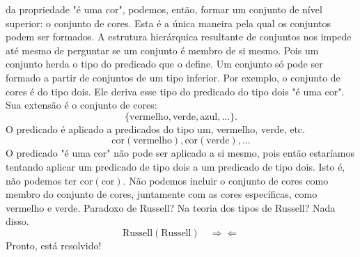       da propriedade "é uma cor", podemos, então, formar um conjunto de nível 
      superior: o conjunto de cores.\newline
      Esta é a única maneira pela qual os conjuntos podem ser formados. A estrutura 
      hierárquica resultante de conjuntos nos impede até mesmo de perguntar se um 
      conjunto é membro de si mesmo. Pois um conjunto herda o tipo do predicado que 
      o define. Um conjunto só pode ser formado a partir de conjuntos de um tipo 
      inferior. Por exemplo, o conjunto de cores é do tipo dois. Ele deriva esse tipo 
      do predicado do tipo dois "é uma cor". Sua extensão é o conjunto de cores: 
      $$\{\textrm{vermelho}, \textrm{verde}, \textrm{azul}, ...\}.$$ O predicado é 
      aplicado a predicados do tipo um, vermelho, verde, etc.
      $$\textrm{cor}(\textrm{vermelho}), \textrm{cor}(\textrm{verde}), ...$$
      O predicado "é uma cor" não pode ser aplicado a si mesmo, pois então 
      estaríamos tentando aplicar um predicado de tipo dois a um predicado de tipo 
      dois. Isto é, não podemos ter $\textrm{cor}(\textrm{cor})$. Não podemos incluir 
      o conjunto de cores como membro do conjunto de cores, juntamente com as cores 
      específicas, como vermelho e verde.\newline
      Paradoxo de Russell? Na teoria dos tipos de Russell? Nada disso.
      $$\textrm{Russell}(\textrm{Russell})\quad \Rightarrow\Leftarrow$$ Pronto, 
      está resolvido!
